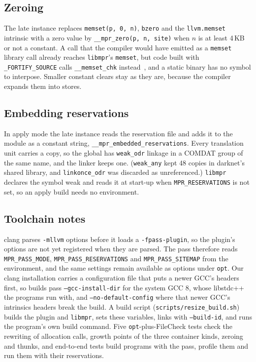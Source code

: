 \documentclass[11pt]{article}
\newcommand{\libmpr}{\texttt{libmpr}}
\begin{document}
\subsection{Zeroing}

The late instance replaces \texttt{memset(p, 0, n)}, \texttt{bzero} and the \texttt{llvm.memset} intrinsic with a zero
value by \texttt{\_\_mpr\_zero(p, n, site)} when $n$ is at least 4\,KB or not a constant. A call that the compiler
would have emitted as a \texttt{memset} library call already reaches \libmpr{}'s \texttt{memset}, but code built with
\texttt{\_FORTIFY\_SOURCE} calls \texttt{\_\_memset\_chk} instead~\cite{GlibcFortify}, and a static binary has no symbol
to interpose. Smaller constant clears stay as they are, because the compiler expands them into stores.

\subsection{Embedding reservations}

In apply mode the late instance reads the reservation file and adds it to the module as a constant string,
\texttt{\_\_mpr\_embedded\_reservations}. Every translation unit carries a copy, so the global has
\texttt{weak\_odr} linkage in a COMDAT group of the same name, and the linker keeps one. (\texttt{weak\_any}
kept 48 copies in darknet's shared library, and \texttt{linkonce\_odr} was discarded as unreferenced.) \libmpr{}
declares the symbol weak and reads it at start-up when \texttt{MPR\_RESERVATIONS} is not set, so an apply build
needs no environment.

\subsection{Toolchain notes}

clang parses \texttt{-mllvm} options before it loads a \texttt{-fpass-plugin}, so the plugin's options are not
yet registered when they are parsed. The pass therefore reads \texttt{MPR\_PASS\_MODE},
\texttt{MPR\_PASS\_RESERVATIONS} and \texttt{MPR\_PASS\_SITEMAP} from the environment, and the same settings remain
available as options under \texttt{opt}. Our clang installation carries a configuration file that puts a newer
GCC's headers first, so builds pass \texttt{--gcc-install-dir} for the system GCC 8, whose libstdc++ the programs run
with, and \texttt{--no-default-config} where that newer GCC's intrinsics headers break the build. A build script
(\texttt{scripts/resize\_build.sh}) builds the plugin and \libmpr{}, sets these variables, links with
\texttt{--build-id}, and runs the program's own build command. Five \texttt{opt}-plus-FileCheck tests check the
rewriting of allocation calls, growth points of the three container kinds, zeroing and thunks, and end-to-end
tests build programs with the pass, profile them and run them with their reservations.
\end{document}
